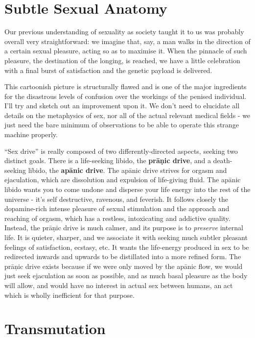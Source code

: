 \documentclass[a4paper,14pt]{memoir}
\newcommand{\pranic}{prāṇic}
\newcommand{\apanic}{apānic}
\begin{document}
\section{Subtle Sexual Anatomy}

Our previous understanding of sexuality as society taught it to us was probably overall very straightforward: we imagine that, say, a man walks in the direction of a certain sexual pleasure, acting so as to maximise it. When the pinnacle of such pleasure, the destination of the longing, is reached, we have a little celebration with a final burst of satisfaction and the genetic payload is delivered.

This cartoonish picture is structurally flawed and is one of the major ingredients for the disastrous levels of confusion over the workings of the penised individual. I'll try and sketch out an improvement upon it. We don't need to elucidate all details on the metaphysics of sex, nor all of the actual relevant medical fields - we just need the bare minimum of observations to be able to operate this strange machine properly.

``Sex drive'' is really composed of two differently-directed aspects, seeking two distinct goals. There is a life-seeking libido, the \textbf{\pranic{} drive}, and a death-seeking libido, the \textbf{\apanic{} drive}. The \apanic{} drive strives for orgasm and ejaculation, which are dissolution and expulsion of life-giving fluid. The \apanic{} libido wants you to come undone and disperse your life energy into the rest of the universe - it's self destructive, ravenous, and feverish. It follows closely the dopamine-rich intense pleasure of sexual stimulation and the approach and reaching of orgasm, which has a restless, intoxicating and addictive quality. Instead, the \pranic{} drive is much calmer, and its purpose is to \emph{preserve} internal life. It is quieter, sharper, and we associate it with seeking much subtler pleasant feelings of satisfaction, ecstasy, etc. It wants the life-energy produced in sex to be redirected inwards and upwards to be distillated into a more refined form. The \pranic{} drive exists because if we were only moved by the \apanic{} flow, we would just seek ejaculation as soon as possible, and as much basal pleasure as the body will allow, and would have no interest in actual sex between humans, an act which is wholly inefficient for that purpose.



\section{Transmutation}
\end{document}
